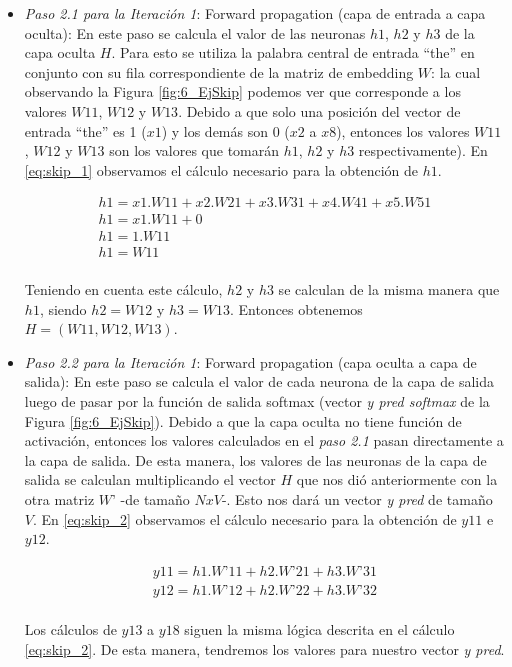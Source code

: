 \documentclass[12pt,a4paper]{article}
\begin{document}
\begin{sloppypar}
\begin{enumerate}
\begin{itemize}
\begin{itemize}
\item \textit{Paso 2.1 para la Iteración 1}: Forward propagation (capa de entrada a capa oculta): En este paso se calcula el valor de las neuronas $h1$, $h2$ y $h3$ de la capa oculta $H$. Para esto se utiliza la palabra central de entrada “the” en conjunto con su fila correspondiente de la matriz de embedding $W$: la cual observando la Figura \ref{fig:6_EjSkip} podemos ver que corresponde a los valores $W11$, $W12$ y $W13$. Debido a que solo una posición del vector de entrada “the” es 1 ($x1$) y los demás son 0 ($x2$ a $x8$), entonces los valores $W11$, $W12$ y $W13$ son los valores que tomarán $h1$, $h2$ y $h3$ respectivamente). En \ref{eq:skip_1} observamos el cálculo necesario para la obtención de $h1$.

\begin{equation}\label{eq:skip_1}
\begin{gathered}
h1 = x1 . W11 + x2 . W21 + x3 . W31 + x4 . W41 + x5 . W51 \\ 
h1 = x1 . W11 + 0 \\ 
h1 = 1 . W11 \\  
h1 = W11 
\end{gathered}
\end{equation}
\\
Teniendo en cuenta este cálculo, $h2$ y $h3$ se calculan de la misma manera que $h1$, siendo $h2 = W12$ y $h3 = W13$. Entonces obtenemos $H = (W11, W12, W13)$. \\

\item \textit{Paso 2.2 para la Iteración 1}: Forward propagation (capa oculta a capa de salida): En este paso se calcula el valor de cada neurona de la capa de salida luego de pasar por la función de salida softmax (vector \textit{y pred softmax} de la Figura \ref{fig:6_EjSkip}). Debido a que la capa oculta no tiene función de activación, entonces los valores calculados en el \textit{paso 2.1} pasan directamente a la capa de salida. De esta manera, los valores de las neuronas de la capa de salida se calculan multiplicando el vector $H$ que nos dió anteriormente con la otra matriz $W’$ -de tamaño $N x V$-. Esto nos dará un vector \textit{y pred} de tamaño $V$. En \ref{eq:skip_2} observamos el cálculo necesario para la obtención de $y11$ e $y12$.

\begin{equation}\label{eq:skip_2}
\begin{gathered}
y11 = h1 . W’11 + h2 . W’21 + h3 . W’31  \\
y12 = h1 . W’12 + h2 . W’22 + h3 . W’32
\end{gathered}
\end{equation}
\\
Los cálculos de $y13$ a $y18$ siguen la misma lógica descrita en el cálculo \ref{eq:skip_2}. De esta manera, tendremos los valores para nuestro vector \textit{y pred}.


\end{itemize}
\end{itemize}
\end{enumerate}
\end{sloppypar}
\end{document}
